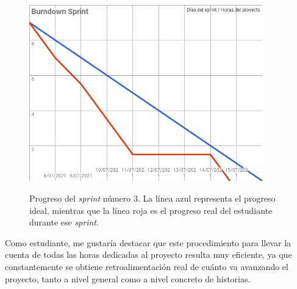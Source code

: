 \begin{figure}[h]
\centering
\includegraphics[width=0.9\textwidth]{logos/sprint4.png}\\[1.4cm]
\caption{Progreso del \textit{sprint} número 3. La línea azul representa el progreso ideal, mientras que la línea roja es el progreso real del estudiante durante ese \textit{sprint}.}
\label{img:sprint3}
\end{figure}

Como estudiante, me gustaría destacar que este procedimiento para llevar la cuenta de todas las horas dedicadas al proyecto resulta muy eficiente, ya que constantemente se obtiene retroalimentación real de cuánto va avanzando el proyecto, tanto a nivel general como a nivel concreto de historias.